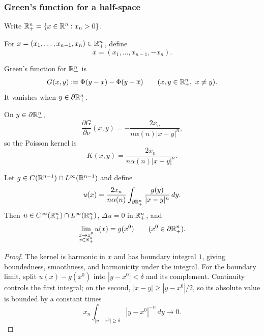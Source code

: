 \subsubsection{Green's function for a half-space}
\label{sec:laplace-greens-function-half-space}

Write $\mathbb{R}^n_+=\{x\in\mathbb{R}^n:x_n>0\}$.

\begin{definition}
\label{def:reflection-half-space}




For $x=(x_1,\ldots,x_{n-1},x_n)\in\mathbb{R}^n_+$, define
$$\overline x=(x_1,\ldots,x_{n-1},-x_n).$$
\end{definition}

\begin{definition}
\label{def:greens-function-half-space}




Green's function for $\mathbb{R}^n_+$ is
$$G(x,y):=\Phi(y-x)-\Phi(y-\overline x)
\qquad(x,y\in\mathbb{R}^n_+,\ x\ne y).$$
It vanishes when $y\in\partial\mathbb{R}^n_+$.
\end{definition}

On $y\in\partial\mathbb{R}^n_+$,
$$\frac{\partial G}{\partial\nu}(x,y)
=-\frac{2x_n}{n\alpha(n)|x-y|^n},$$
so the Poisson kernel is
$$K(x,y)=\frac{2x_n}{n\alpha(n)|x-y|^n}.$$

\begin{theorem}
\label{thm:poissons-formula-half-space}

Let $g\in C(\mathbb{R}^{n-1})\cap L^\infty(\mathbb{R}^{n-1})$ and define
$$u(x)=\frac{2x_n}{n\alpha(n)}
\int_{\partial\mathbb{R}^n_+}\frac{g(y)}{|x-y|^n}\,dy.$$
Then $u\in C^\infty(\mathbb{R}^n_+)\cap L^\infty(\mathbb{R}^n_+)$,
$\Delta u=0$ in $\mathbb{R}^n_+$, and
$$\lim_{\substack{x\to x^0\\x\in\mathbb{R}^n_+}}u(x)=g(x^0)
\qquad(x^0\in\partial\mathbb{R}^n_+).$$
\end{theorem}
\begin{proof}
\sketch The kernel is harmonic in $x$ and has boundary integral $1$, giving
boundedness, smoothness, and harmonicity under the integral. For the boundary
limit, split $u(x)-g(x^0)$ into $|y-x^0|<\delta$ and its complement.
Continuity controls the first integral; on the second,
$|x-y|\ge|y-x^0|/2$, so its absolute value is bounded by a constant times
$$x_n\int_{|y-x^0|\ge\delta}|y-x^0|^{-n}\,dy\to0.$$
\end{proof}

